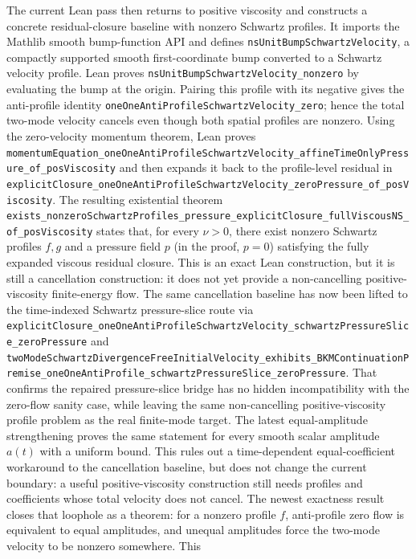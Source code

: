 \documentclass[11pt]{article}
\begin{document}
The current Lean pass then returns to positive viscosity and constructs a
concrete residual-closure baseline with nonzero Schwartz profiles.  It imports
the Mathlib smooth bump-function API and defines
\texttt{nsUnitBumpSchwartzVelocity}, a compactly supported smooth
first-coordinate bump converted to a Schwartz velocity profile.  Lean proves
\texttt{nsUnitBumpSchwartzVelocity\_nonzero} by evaluating the bump at the
origin.  Pairing this profile with its negative gives the anti-profile identity
\texttt{oneOneAntiProfileSchwartzVelocity\_zero}; hence the total two-mode
velocity cancels even though both spatial profiles are nonzero.  Using the
zero-velocity momentum theorem, Lean proves
\texttt{momentumEquation\_oneOneAntiProfileSchwartzVelocity\_affineTimeOnlyPressure\_of\_posViscosity}
and then expands it back to the profile-level residual in
\texttt{explicitClosure\_oneOneAntiProfileSchwartzVelocity\_zeroPressure\_of\_posViscosity}.
The resulting existential theorem
\texttt{exists\_nonzeroSchwartzProfiles\_pressure\_explicitClosure\_fullViscousNS\_of\_posViscosity}
states that, for every \(\nu>0\), there exist nonzero Schwartz profiles
\(f,g\) and a pressure field \(p\) (in the proof, \(p=0\)) satisfying the fully
expanded viscous residual closure.  This is an exact Lean construction, but it
is still a cancellation construction: it does not yet provide a non-cancelling
positive-viscosity finite-energy flow.
The same cancellation baseline has now been lifted to the time-indexed
Schwartz pressure-slice route via
\texttt{explicitClosure\_oneOneAntiProfileSchwartzVelocity\_schwartzPressureSlice\_zeroPressure}
and
\texttt{twoModeSchwartzDivergenceFreeInitialVelocity\_exhibits\_BKMContinuationPremise\_oneOneAntiProfile\_schwartzPressureSlice\_zeroPressure}.
That confirms the repaired pressure-slice bridge has no hidden incompatibility
with the zero-flow sanity case, while leaving the same non-cancelling
positive-viscosity profile problem as the real finite-mode target.
The latest equal-amplitude strengthening proves the same statement for every
smooth scalar amplitude \(a(t)\) with a uniform bound.  This rules out a
time-dependent equal-coefficient workaround to the cancellation baseline, but
does not change the current boundary: a useful positive-viscosity construction
still needs profiles and coefficients whose total velocity does not cancel.
The newest exactness result closes that loophole as a theorem: for a nonzero
profile \(f\), anti-profile zero flow is equivalent to equal amplitudes, and
unequal amplitudes force the two-mode velocity to be nonzero somewhere.  This
\end{document}
